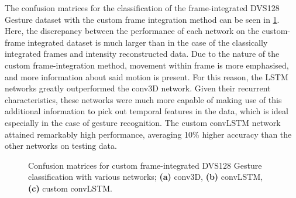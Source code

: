 The confusion matrices for the classification of the frame-integrated DVS128 Gesture dataset with the custom frame integration method can be seen in \cref{fig:dvs128_custom_frame_c_matrices}. Here, the discrepancy between the performance of each network on the custom-frame integrated dataset is much larger than in the case of the classically integrated frames and intensity reconstructed data. Due to the nature of the custom frame-integration method, movement within frame is more emphasised, and more information about said motion is present. For this reason, the LSTM networks greatly outperformed the conv3D network. Given their recurrent characteristics, these networks were much more capable of making use of this additional information to pick out temporal features in the data, which is ideal especially in the case of gesture recognition. The custom convLSTM network attained remarkably high performance, averaging 10\% higher accuracy than the other networks on testing data.

\begin{figure}[htb]%
    \centering
    \qquad
    \qquad
    \caption{Confusion matrices for custom frame-integrated DVS128 Gesture classification with various networks; \textbf{(a)} conv3D, \textbf{(b)} convLSTM, \textbf{(c)} custom convLSTM.}%
    \label{fig:dvs128_custom_frame_c_matrices}%
\end{figure}

